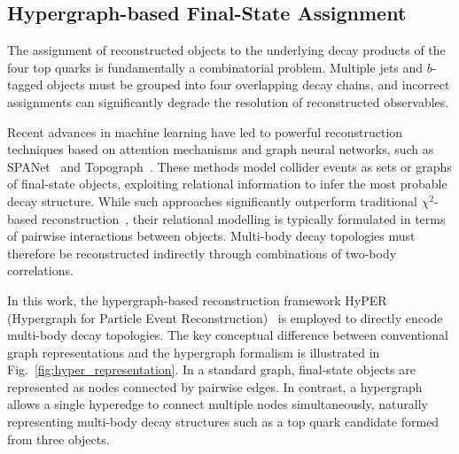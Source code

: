 \subsection{Hypergraph-based Final-State Assignment}

The assignment of reconstructed objects to the underlying decay products of the four top quarks is fundamentally a combinatorial problem. 
Multiple jets and $b$-tagged objects must be grouped into four overlapping decay chains, and incorrect assignments can significantly degrade the resolution of reconstructed observables.

Recent advances in machine learning have led to powerful reconstruction techniques based on attention mechanisms and graph neural networks, such as SPANet~\cite{Fenton2022Permutationless,Shmakov2022SPANet} and Topograph~\cite{Ehrke2023Topological}. 
These methods model collider events as sets or graphs of final-state objects, exploiting relational information to infer the most probable decay structure. 
While such approaches significantly outperform traditional $\chi^2$-based reconstruction~\cite{ATLAS2017TopMassAllHadronic},
their relational modelling is typically formulated in terms of pairwise interactions between objects. 
Multi-body decay topologies must therefore be reconstructed indirectly through combinations of two-body correlations.

In this work, the hypergraph-based reconstruction framework HyPER (Hypergraph for Particle Event Reconstruction)~\cite{HyPER} is employed to directly encode multi-body decay topologies.
The key conceptual difference between conventional graph representations and the hypergraph formalism is illustrated in Fig.~\ref{fig:hyper_representation}. 
In a standard graph, final-state objects are represented as nodes connected by pairwise edges. 
In contrast, a hypergraph allows a single hyperedge to connect multiple nodes simultaneously, naturally representing multi-body decay structures such as a top quark candidate formed from three objects.

